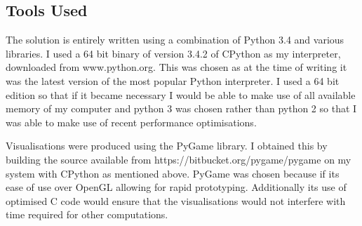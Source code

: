\documentclass[12pt,a4paper]{article}
\begin{document}



\subsection{Tools Used}
\noindent
The solution is entirely written using a combination of Python 3.4 and various libraries. I used a 64 bit binary of version 3.4.2 of CPython as my interpreter, downloaded from www.python.org. This was chosen as at the time of writing it was the latest version of the most popular Python interpreter. I used a 64 bit edition so that if it became necessary I would be able to make use of all available memory of my computer and python 3 was chosen rather than python 2 so that I was able to make use of recent performance optimisations.

Visualisations were produced using the PyGame library. I obtained this by building the source available from https://bitbucket.org/pygame/pygame on my system with CPython as mentioned above. PyGame was chosen because if its ease of use over OpenGL allowing for rapid prototyping. Additionally its use of optimised C code would ensure that the visualisations would not interfere with time required for other computations.
\end{document}
